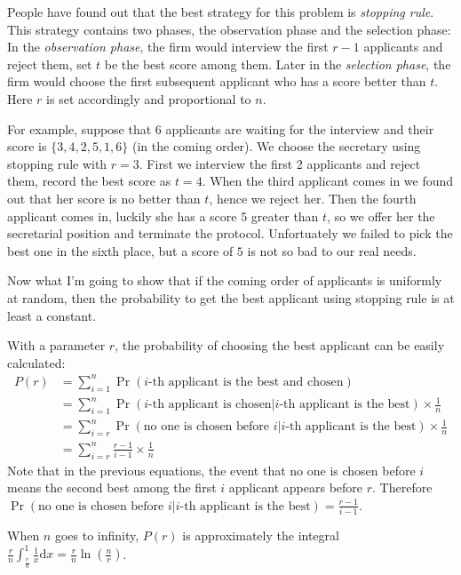 People have found out that the best strategy for this problem is 
\emph{stopping rule}. This strategy contains two phases, the observation
phase and the selection phase:
In the \emph{observation phase}, the firm would interview the first $r - 1$ 
applicants and reject them, set $t$ be the best score among them.
Later in the \emph{selection phase}, the firm would choose the first 
subsequent applicant who has a score better than $t$.
Here $r$ is set accordingly and proportional to $n$.

For example, suppose that 6 applicants are waiting for the interview
and their score is $\{3, 4, 2, 5, 1, 6\}$ (in the coming order).
We choose the secretary using stopping rule with $r = 3$. First we
interview the first 2 applicants and reject them, record the best score
as $t = 4$. When the third applicant comes in we found out that her score
is no better than $t$, hence we reject her. Then the fourth applicant comes
in, luckily she has a score $5$ greater than $t$, so we offer her the 
secretarial position and terminate the protocol. Unfortuately we failed to
pick the best one in the sixth place, but a score of $5$ is not so bad to
our real needs.

Now what I'm going to show that if the coming order of applicants is
uniformly at random, then the probability to get the best applicant using
stopping rule is at least a constant.

With a parameter $r$, the probability of choosing the best applicant can
be easily calculated:
\begin{align*}
    P(r) &= \sum_{i = 1}^n \Pr(\text{$i$-th applicant is the best and chosen}) \\
         &= \sum_{i = 1}^n \Pr(\text{$i$-th applicant is chosen} | \text{$i$-th applicant is the best}) \times \frac{1}{n} \\
         &= \sum_{i = r}^n \Pr(\text{no one is chosen before $i$}|\text{$i$-th applicant is the best}) \times \frac{1}{n} \\
         &= \sum_{i = r}^n \frac{r - 1}{i - 1} \times \frac{1}{n}
\end{align*}
Note that in the previous equations, the event that no one is chosen 
before $i$ means the second best among the first $i$ applicant 
appears before $r$. Therefore \\  
$\Pr(\text{no one is chosen before $i$}|\text{$i$-th applicant is the best}) = \frac{r - 1}{i - 1}$.

When $n$ goes to infinity, $P(r)$ is approximately the integral
$\frac{r}{n} \int_{\frac{r}{n}}^1 \frac{1}{x} \mathrm{d}x 
= \frac{r}{n} \ln(\frac{n}{r})$.

